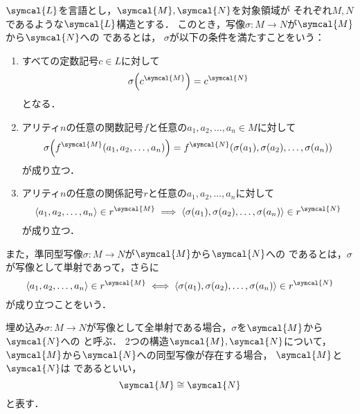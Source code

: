 \begin{Def} \label{Def:isomorphic}
	\(\symcal{L}\)を言語とし，\(\symcal{M}, \symcal{N}\)を対象領域が
	それぞれ\(M, N\)であるような\(\symcal{L}\)構造とする．
	このとき，写像\(\sigma \colon M \to N\)が\(\symcal{M}\)から\(\symcal{N}\)への%
	であるとは，
	\(\sigma\)が以下の条件を満たすことをいう：
	\begin{enumerate}
		\item すべての定数記号\(c \in L\)に対して
		      \begin{equation}
			      \apply{\sigma}{\interpretation{\symcal{M}}{c}} = \interpretation{\symcal{N}}{c}
			      \label{eq:constanthomorphism}
		      \end{equation}
		      となる．
		\item アリティ\(n\)の任意の関数記号\(f\)と任意の\(a_1, a_2, \dots, a_n \in M\)に対して
		      \begin{equation}
			      \apply{\sigma}{\apply{\interpretation{\symcal{M}}{f}}{a_1, a_2, \dots, a_n}}
			      = \apply{\interpretation{\symcal{N}}{f}}{
				      \apply{\sigma}{a_1}, \apply{\sigma}{a_2}, \dots, \apply{\sigma}{a_n}
			      }
			      \label{eq:functionhomorphism}
		      \end{equation}
		      が成り立つ．
		\item アリティ\(n\)の任意の関係記号\(r\)と任意の\(a_1, a_2, \dots, a_n\)に対して
		      \begin{equation}
			      \pair{a_1, a_2, \dots, a_n} \in \interpretation{\symcal{M}}{r}
			      \metaimplies \pair{\apply{\sigma}{a_1}, \apply{\sigma}{a_2}, \dots, \apply{\sigma}{a_n}} \in \interpretation{\symcal{N}}{r}
			      \label{eq:relationhomorphism}
		      \end{equation}
		      が成り立つ．
	\end{enumerate}

	また，準同型写像\(\sigma \colon M \to N\)が\(\symcal{M}\)から\(\symcal{N}\)への%
	であるとは，\(\sigma\)が写像として単射であって，さらに
	\begin{equation}
		\pair{a_1, a_2, \dots, a_n} \in \interpretation{\symcal{M}}{r}
		\metaequivalent \pair{\apply{\sigma}{a_1}, \apply{\sigma}{a_2}, \dots, \apply{\sigma}{a_n}} \in \interpretation{\symcal{N}}{r}
		\label{eq:relationembedding}
	\end{equation}
	が成り立つことをいう．

	埋め込み\(\sigma \colon M \to N\)が写像として全単射である場合，\(\sigma\)を\(\symcal{M}\)から\(\symcal{N}\)への
	と呼ぶ．
	2つの構造\(\symcal{M}, \symcal{N}\)について，\(\symcal{M}\)から\(\symcal{N}\)への同型写像が存在する場合，
	\(\symcal{M}\)と\(\symcal{N}\)は%
	であるといい，%
	\begin{equation}
		\symcal{M} \isomorphic \symcal{N}
		\label{eq:isomorphic}
	\end{equation}
	と表す．
\end{Def}

